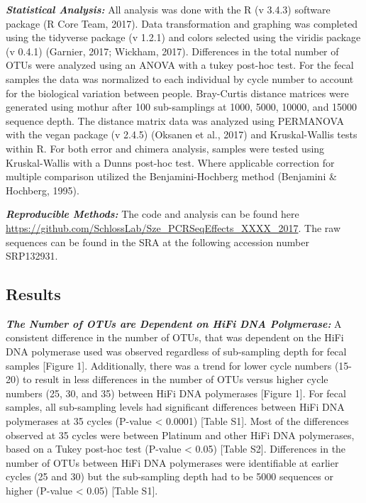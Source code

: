 \documentclass[12pt,]{article}
\begin{document}
\textbf{\emph{Statistical Analysis:}} All analysis was done with the R
(v 3.4.3) software package (R Core Team, 2017). Data transformation and
graphing was completed using the tidyverse package (v 1.2.1) and colors
selected using the viridis package (v 0.4.1) (Garnier, 2017; Wickham,
2017). Differences in the total number of OTUs were analyzed using an
ANOVA with a tukey post-hoc test. For the fecal samples the data was
normalized to each individual by cycle number to account for the
biological variation between people. Bray-Curtis distance matrices were
generated using mothur after 100 sub-samplings at 1000, 5000, 10000, and
15000 sequence depth. The distance matrix data was analyzed using
PERMANOVA with the vegan package (v 2.4.5) (Oksanen et al., 2017) and
Kruskal-Wallis tests within R. For both error and chimera analysis,
samples were tested using Kruskal-Wallis with a Dunns post-hoc test.
Where applicable correction for multiple comparison utilized the
Benjamini-Hochberg method (Benjamini \& Hochberg, 1995).

\textbf{\emph{Reproducible Methods:}} The code and analysis can be found
here \url{https://github.com/SchlossLab/Sze_PCRSeqEffects_XXXX_2017}.
The raw sequences can be found in the SRA at the following accession
number SRP132931.

\newpage

\subsection{Results}\label{results}

\textbf{\emph{The Number of OTUs are Dependent on HiFi DNA Polymerase:}}
A consistent difference in the number of OTUs, that was dependent on the
HiFi DNA polymerase used was observed regardless of sub-sampling depth
for fecal samples {[}Figure 1{]}. Additionally, there was a trend for
lower cycle numbers (15-20) to result in less differences in the number
of OTUs versus higher cycle numbers (25, 30, and 35) between HiFi DNA
polymerases {[}Figure 1{]}. For fecal samples, all sub-sampling levels
had significant differences between HiFi DNA polymerases at 35 cycles
(P-value \textless{} 0.0001) {[}Table S1{]}. Most of the differences
observed at 35 cycles were between Platinum and other HiFi DNA
polymerases, based on a Tukey post-hoc test (P-value \textless{} 0.05)
{[}Table S2{]}. Differences in the number of OTUs between HiFi DNA
polymerases were identifiable at earlier cycles (25 and 30) but the
sub-sampling depth had to be 5000 sequences or higher (P-value
\textless{} 0.05) {[}Table S1{]}.
\end{document}
